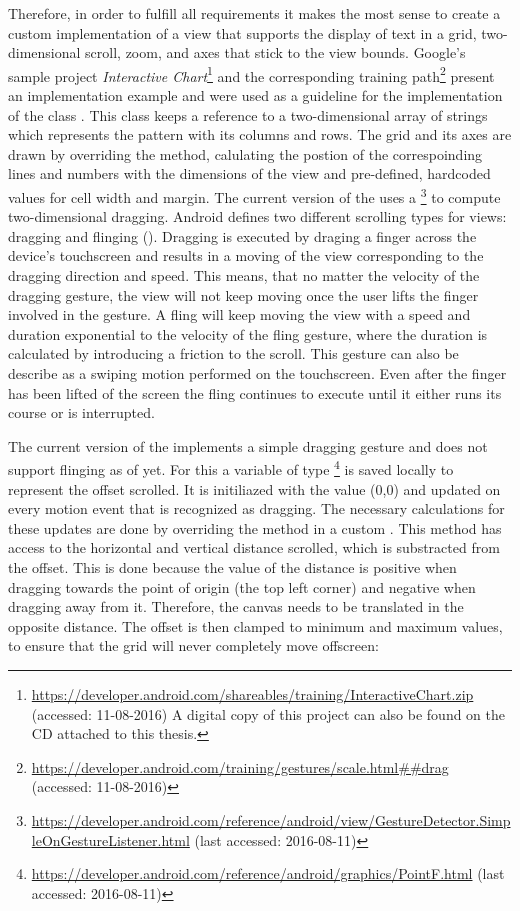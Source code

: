 Therefore, in order to fulfill all requirements it makes the most sense to create a custom implementation of a view that supports the display of text in a grid, two-dimensional scroll, zoom, and axes that stick to the view bounds. Google's sample project \textit{Interactive Chart}\footnote{\url{https://developer.android.com/shareables/training/InteractiveChart.zip} (accessed: 11-08-2016) A digital copy of this project can also be found on the CD attached to this thesis.} and the corresponding training path\footnote{\url{https://developer.android.com/training/gestures/scale.html##drag} (accessed: 11-08-2016)} present an implementation example and were used as a guideline for the implementation of the class  . This class keeps a reference to a two-dimensional array of strings which represents the pattern with its columns and rows. The grid and its axes are drawn by overriding the  method, calulating the postion of the correspoinding lines and numbers with the dimensions of the view and pre-defined, hardcoded values for cell width and margin. The current version of the  uses a \footnote{\url{https://developer.android.com/reference/android/view/GestureDetector.SimpleOnGestureListener.html} (last accessed: 2016-08-11)} to compute two-dimensional dragging. Android defines two different scrolling types for views: dragging and flinging (\cite{android_scrolling_types}). Dragging is executed by draging a finger across the device's touchscreen and results in a moving of the view corresponding to the dragging direction and speed. This means, that no matter the velocity of the dragging gesture, the view will not keep moving once the user lifts the finger involved in the gesture. A fling will keep moving the view with a speed and duration exponential to the velocity of the fling gesture, where the duration is calculated by introducing a friction to the scroll. This gesture can also be describe as a swiping motion performed on the touchscreen. Even after the finger has been lifted of the screen the fling continues to execute until it either runs its course or is interrupted.

The current version of the  implements a simple dragging gesture and does not support flinging as of yet. For this a variable of type \footnote{\url{https://developer.android.com/reference/android/graphics/PointF.html} (last accessed: 2016-08-11)} is saved locally to represent the offset scrolled. It is initiliazed with the value (0,0) and updated on every motion event that is recognized as dragging. The necessary calculations for these updates are done by overriding the  method in a custom . This method has access to the horizontal and vertical distance scrolled, which is substracted from the offset. This is done because the value of the distance is positive when dragging towards the point of origin (the top left corner) and negative when dragging away from it. Therefore, the canvas needs to be translated in the opposite distance. The offset is then clamped to minimum and maximum values, to ensure that the grid will never completely move offscreen: 

